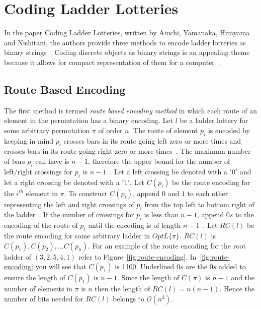 \section{Coding Ladder Lotteries}
In the paper Coding Ladder Lotteries, written by Aiuchi, Yamanaka, Hirayama and Nishitani, the authors provide three methods to encode ladder lotteries as 
binary strings~\cite{A5}. Coding discrete objects as binary strings is an appealing theme because 
it allows for compact representation of them for a computer~\cite{A5}.
\subsection{Route Based Encoding}
The first method is termed \emph{route based encoding method} in 
which each route of an element in the permutation has a binary encoding. Let $l$
be a ladder lottery for some arbitrary permutation $\pi$ of order $n$. The route 
of element $p_{i}$ is encoded by keeping in mind $p_{i}$ crosses bars in its route 
going left zero or more times and crosses bars in its route going right zero or 
more times~\cite{A5}. The maximum number of bars $p_{i}$ can have is $n-1$, therefore the 
upper bound for the number of left/right crossings for $p_{i}$ is $n-1$~\cite{A5}. 
Let a left crossing be denoted with a $'0'$ and let a right crossing be denoted 
with a $'1'$. Let $C(p_{i})$ be the route encoding for the $i^{th}$ element 
in $\pi$. To construct $C(p_{i})$,  append $0$ and $1$ to each other representing 
the left and right crossings of $p_{i}$ from the top left 
to bottom right of the ladder~\cite{A5}. If the number of crossings for $p_{i}$ 
is less than $n-1$, append $0s$ to the encoding of the route of $p_{i}$ until
the encoding is of length $n-1$~\cite{A5}. Let $RC(l)$ be the route encoding for 
some arbitrary ladder in $OptL\{\pi\}$. $RC(l)$ is $C(p_{1}), C(p_{2}), \dots C(p_{n})$.
For an example of the route encoding for the root ladder of $(3,2,5,4,1)$ refer to 
Figure~\ref{fig:route-encoding}. In~\ref{fig:route-encoding} you will see that $C(p_{1})$ is 11\underline{00}. Underlined 
$0s$ are the $0s$ added to ensure the length of $C(p_{1})$ is $n-1$.
Since the length of $C(\pi)$ is $n-1$ and the number of elements in $\pi$ is $n$
then the length of $RC(l)=n(n-1)$. Hence the number of bits needed for $RC(l)$ 
belongs to $\mathcal{O}(n^{2})$.\par 
